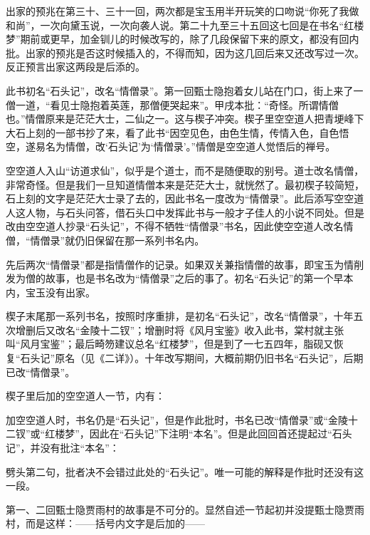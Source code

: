 \par 出家的预兆在第三十、三十一回，两次都是宝玉用半开玩笑的口吻说“你死了我做和尚”，一次向黛玉说，一次向袭人说。第二十九至三十五回这七回是在书名“红楼梦”期前或更早，加金钏儿的时候改写的，除了几段保留下来的原文，都没有回内批。出家的预兆是否这时候插入的，不得而知，因为这几回后来又还改写过一次。反正预言出家这两段是后添的。
\par 此书初名“石头记”，改名“情僧录”。第一回甄士隐抱着女儿站在门口，街上来了一僧一道，“看见士隐抱着英莲，那僧便哭起来”。甲戌本批：“奇怪。所谓情僧也。”情僧原来是茫茫大士，二仙之一。这与楔子冲突。楔子里空空道人把青埂峰下大石上刻的一部书抄了来，看了此书“因空见色，由色生情，传情入色，自色悟空，遂易名为情僧，改‘石头记’为‘情僧录’。”情僧是空空道人觉悟后的禅号。
\par 空空道人入山“访道求仙”，似乎是个道士，而不是随便取的别号。道士改名情僧，非常奇怪。但是我们一旦知道情僧本来是茫茫大士，就恍然了。最初楔子较简短，石上刻的文字是茫茫大士录了去的，因此书名一度改为“情僧录”。此后添写空空道人这人物，与石头问答，借石头口中发挥此书与一般才子佳人的小说不同处。但是改由空空道人抄录“石头记”，不得不牺牲“情僧录”书名，因此使空空道人改名情僧，“情僧录”就仍旧保留在那一系列书名内。
\par 先后两次“情僧录”都是指情僧作的记录。如果双关兼指情僧的故事，即宝玉为情削发为僧的故事，也是书名改为“情僧录”之后的事了。初名“石头记”的第一个早本内，宝玉没有出家。
\par 楔子末尾那一系列书名，按照时序重排，是初名“石头记”，改名“情僧录”，十年五次增删后又改名“金陵十二钗”；增删时将《风月宝鉴》收入此书，棠村就主张叫“风月宝鉴”；最后畸笏建议总名“红楼梦”，但是到了一七五四年，脂砚又恢复“石头记”原名（见《二详》）。十年改写期间，大概前期仍旧书名“石头记”，后期已改“情僧录”。
\par 楔子里后加的空空道人一节，内有：
\par 加空空道人时，书名仍是“石头记”，但是作此批时，书名已改“情僧录”或“金陵十二钗”或“红楼梦”，因此在“石头记”下注明“本名”。但是此回回首还提起过“石头记”，并没有批注“本名”：
\par 劈头第二句，批者决不会错过此处的“石头记”。唯一可能的解释是作批时还没有这一段。
\par 第一、二回甄士隐贾雨村的故事是不可分的。显然自述一节起初并没提甄士隐贾雨村，而是这样：——括号内文字是后加的——
